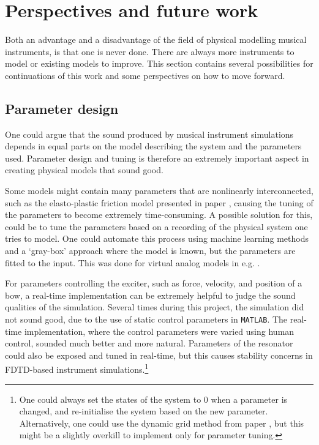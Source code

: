 

\section{Perspectives and future work}
Both an advantage and a disadvantage of the field of physical modelling musical instruments, is that one is never done. There are always more instruments to model or existing models to improve. This section contains several possibilities for continuations of this work and some perspectives on how to move forward.

\subsection{Parameter design}\label{sec:parameterDesign}
One could argue that the sound produced by musical instrument simulations depends in equal parts on the model describing the system and the parameters used. Parameter design and tuning is therefore an extremely important aspect in creating physical models that sound good. 

Some models might contain many parameters that are nonlinearly interconnected, such as the elasto-plastic friction model presented in paper \citeP[C], causing the tuning of the parameters to become extremely time-consuming. A possible solution for this, could be to tune the parameters based on a recording of the physical system one tries to model. 
One could automate this process using machine learning methods and a `gray-box' approach where the model is known, but the parameters are fitted to the input. This was done for virtual analog models in e.g. \cite{Eichas2017, Parker2019}. 

For parameters controlling the exciter, such as force, velocity, and position of a bow, a real-time implementation can be extremely helpful to judge the sound qualities of the simulation. Several times during this project, the simulation did not sound good, due to the use of static control parameters in \texttt{MATLAB}. The real-time implementation, where the control parameters were varied using human control, sounded much better and more natural. Parameters of the resonator could also be exposed and tuned in real-time, but this causes stability concerns in FDTD-based instrument simulations.\footnote{One could always set the states of the system to 0 when a parameter is changed, and re-initialise the system based on the new parameter. Alternatively, one could use the dynamic grid method from paper \citeP[G], but this might be a slightly overkill to implement only for parameter tuning.}

